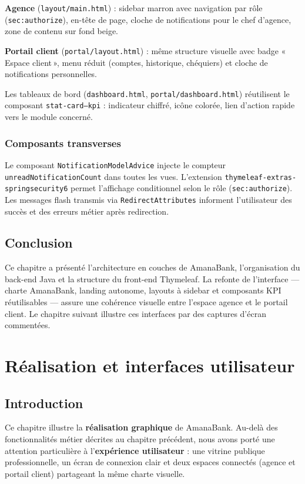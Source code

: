 \documentclass[11pt,a4paper,oneside]{report}
\newcommand{\nomapplication}{AmanaBank}
\begin{document}
\textbf{Agence} (\texttt{layout/main.html}) : sidebar marron avec navigation par rôle (\texttt{sec:authorize}), en-tête de page, cloche de notifications pour le chef d'agence, zone de contenu sur fond beige.

\textbf{Portail client} (\texttt{portal/layout.html}) : même structure visuelle avec badge «\,Espace client\,», menu réduit (comptes, historique, chéquiers) et cloche de notifications personnelles.

Les tableaux de bord (\texttt{dashboard.html}, \texttt{portal/dashboard.html}) réutilisent le composant \texttt{stat-card--kpi} : indicateur chiffré, icône colorée, lien d'action rapide vers le module concerné.

\subsection{Composants transverses}

Le composant \texttt{NotificationModelAdvice} injecte le compteur \texttt{unreadNotificationCount} dans toutes les vues. L'extension \texttt{thymeleaf-extras-springsecurity6} permet l'affichage conditionnel selon le rôle (\texttt{sec:authorize}). Les messages flash transmis via \texttt{RedirectAttributes} informent l'utilisateur des succès et des erreurs métier après redirection.

\section{Conclusion}

Ce chapitre a présenté l'architecture en couches de \nomapplication, l'organisation du back-end Java et la structure du front-end Thymeleaf. La refonte de l'interface — charte AmanaBank, landing autonome, layouts à sidebar et composants KPI réutilisables — assure une cohérence visuelle entre l'espace agence et le portail client. Le chapitre suivant illustre ces interfaces par des captures d'écran commentées.

\chapter{Réalisation et interfaces utilisateur}
\label{ch:realisation}

\section{Introduction}

Ce chapitre illustre la \textbf{réalisation graphique} de \nomapplication. Au-delà des fonctionnalités métier décrites au chapitre précédent, nous avons porté une attention particulière à l'\textbf{expérience utilisateur} : une vitrine publique professionnelle, un écran de connexion clair et deux espaces connectés (agence et portail client) partageant la même charte visuelle.
\end{document}

